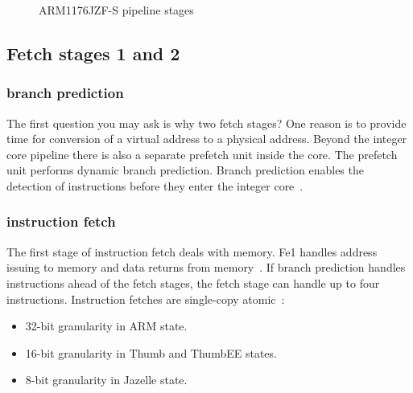 \documentclass[11pt]{report}
\begin{document}
\begin{figure}[H]

\caption{ARM1176JZF-S pipeline stages}
\end{figure}
\begin{onehalfspace}
\subsection{Fetch stages 1 and 2}
\subsubsection{branch prediction}
The first question you may ask is why two fetch stages? One reason is to provide time for conversion of a virtual address to a physical address. Beyond the integer core pipeline there is also a separate prefetch unit inside the core. The prefetch unit performs dynamic branch prediction. Branch prediction enables the detection of instructions before they enter the integer core~\citep[5-4]{arm1176jzf-s}.
\subsubsection{instruction fetch}
The first stage of instruction fetch deals with memory. Fe1 handles address issuing to memory and data returns from memory~\citep[1-26]{arm1176jzf-s}. If branch prediction handles instructions ahead of the fetch stages, the fetch stage can handle up to four instructions. Instruction fetches are single-copy atomic~\citep{arm7}:
\end{onehalfspace}
\begin{itemize}
\item 32-bit granularity in ARM state.
\item 16-bit granularity in Thumb and ThumbEE states.
\item 8-bit granularity in Jazelle state. 
\end{itemize}
\end{document}
